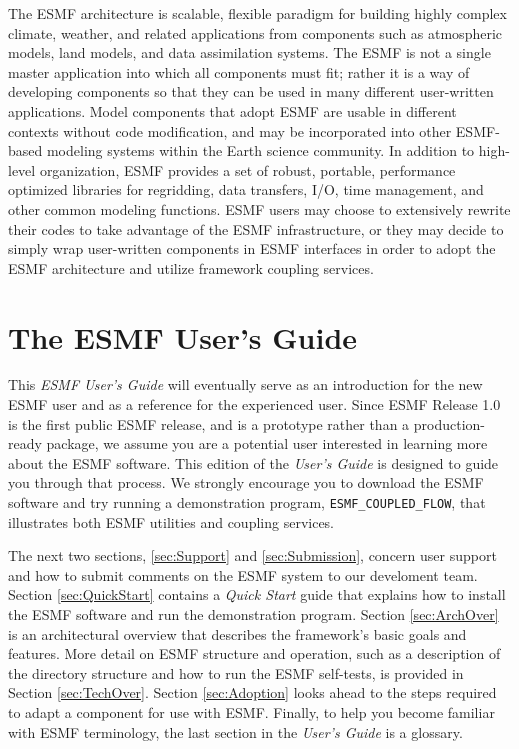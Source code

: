 The ESMF architecture is scalable, flexible paradigm for building highly 
complex climate, weather, and related applications from components such
as atmospheric models, land models, and data assimilation systems.  The 
ESMF is not a single master application into which all components must fit; 
rather it is a way of developing components so that they can be used 
in many different user-written applications.  Model components that adopt 
ESMF are usable in different contexts without code modification, and may be
incorporated into other ESMF-based modeling systems within the Earth 
science community.  In addition to high-level organization, ESMF provides 
a set of robust, portable, performance optimized libraries for regridding, 
data transfers, I/O, time management, and other common modeling functions.  
ESMF users may choose to extensively rewrite their codes to take advantage 
of the ESMF infrastructure, or they may decide to simply wrap user-written 
components in ESMF interfaces in order to adopt the ESMF architecture and 
utilize framework coupling services.

\section{The ESMF User's Guide}

This {\it ESMF User's Guide} will eventually serve as an introduction for the 
new ESMF user and as a reference for the experienced user.  Since ESMF 
Release 1.0 is the first public ESMF release, and is a prototype rather than 
a production-ready package, we assume you are a potential user interested in 
learning more about the ESMF software.  This edition of the {\it User's Guide} 
is designed to guide you through that process.  We strongly encourage you
to download the ESMF software and try running a demonstration program, 
{\tt ESMF\_COUPLED\_FLOW}, that illustrates both ESMF utilities and coupling
services.

The next two sections, \ref{sec:Support} and \ref{sec:Submission}, concern 
user support and how to submit comments on the ESMF system to our develoment 
team.  Section \ref{sec:QuickStart} contains a {\it Quick Start} guide that 
explains how to install the ESMF software and 
run the demonstration program.  Section \ref{sec:ArchOver} is an 
architectural overview that describes the framework's basic goals and features.  
More detail on ESMF structure and operation, such as a description of the 
directory structure and how to run the ESMF self-tests, is provided in Section 
\ref{sec:TechOver}.  Section \ref{sec:Adoption} looks ahead to the steps 
required to adapt a component for use with ESMF.  Finally, to help you become 
familiar with ESMF terminology, the last section in the {\it User's Guide} is 
a glossary.  

















